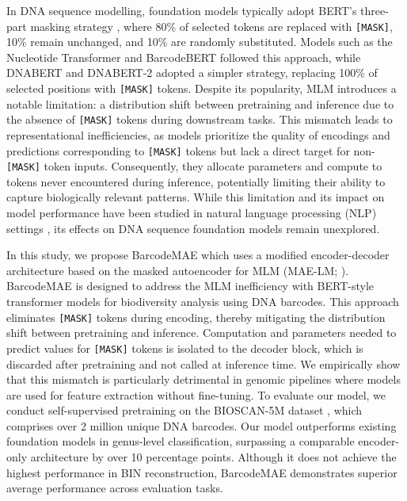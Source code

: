 In DNA sequence modelling, foundation models typically adopt BERT's three-part masking strategy \citep{Devlin2019BERTPO}, where 80\% of selected tokens are replaced with \texttt{[MASK]}, 10\% remain unchanged, and 10\% are randomly substituted. Models such as the Nucleotide Transformer \citep{NucleotideTransformerDalla-Torre2023} and BarcodeBERT \citep{arias2023barcodebert} followed this approach, while DNABERT \citep{Zhou2021DNABERT} and DNABERT-2 \citep{zhou2023dnabert2} adopted a simpler strategy, replacing 100\% of selected positions with \texttt{[MASK]} tokens. Despite its popularity, MLM introduces a notable limitation: a distribution shift between pretraining and inference due to the absence of \texttt{[MASK]} tokens during downstream tasks. This mismatch leads to representational inefficiencies, as models prioritize the quality of encodings and predictions corresponding to \texttt{[MASK]} tokens but lack a direct target for non-\texttt{[MASK]} token inputs. Consequently, they allocate parameters and compute to tokens never encountered during inference, potentially limiting their ability to capture biologically relevant patterns. While this limitation and its impact on model performance have been studied in natural language processing (NLP) settings \citep{meng2024maelm, Electra}, its effects on DNA sequence foundation models remain unexplored.

In this study, we propose ‌BarcodeMAE which uses a modified encoder-decoder architecture based on the masked autoencoder for MLM (MAE-LM; \citealp{meng2024maelm}). BarcodeMAE is designed to address the MLM inefficiency with BERT-style transformer models for biodiversity analysis using DNA barcodes. This approach eliminates \texttt{[MASK]} tokens during encoding, thereby mitigating the distribution shift between pretraining and inference. Computation and parameters needed to predict values for \texttt{[MASK]} tokens is isolated to the decoder block, which is discarded after pretraining and not called at inference time. We empirically show that this mismatch is particularly detrimental in genomic pipelines where models are used for feature extraction without fine-tuning. 
To evaluate our model, we conduct self-supervised pretraining on the BIOSCAN-5M dataset \citep{gharaee2024bioscan5m}, which comprises over 2 million unique DNA barcodes. 
Our model outperforms existing foundation models in genus-level classification, surpassing a comparable encoder-only architecture by over 10 percentage points. Although it does not achieve the highest performance in BIN reconstruction, BarcodeMAE demonstrates superior average performance across evaluation tasks.

